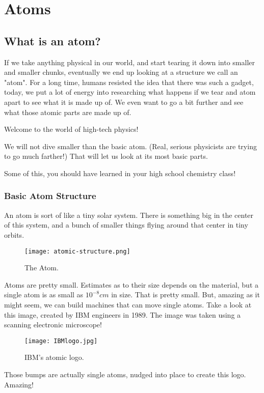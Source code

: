 \chapter{Atoms}
\section{What is an atom?}
If we take anything physical in our world, and start tearing it down into
smaller and smaller chunks, eventually we end up looking at a structure we call
an "atom". For a long time, humans resisted the idea that there was such a
gadget, today, we put a lot of energy into researching what happens if we tear
and atom apart to see what it is made up of. We even want to go a bit further and
see what those atomic parts are made up of.

Welcome to the world of high-tech physics!

We will not dive smaller than the basic atom. (Real, serious physicists are
trying to go much farther!) That will let us look at its most basic parts.

Some of this, you should have learned in your high school chemistry class!

\subsection{Basic Atom Structure}
An atom is sort of like a tiny solar system. There is something big in the
center of this system, and a bunch of smaller things flying around that center
in tiny orbits.

\begin{figure}[ht]
  \caption{The Atom.}
  \centering
  \texttt{[image: atomic-structure.png]}
\end{figure}

Atoms are pretty small. Estimates as to their size depends on the material, but
a single atom is as small as $10^{-8}cm$ in size. That is pretty small.
But, amazing as it might seem, we can build machines that can move single
atoms. Take a look at this image, created by IBM engineers in 1989. The image
was taken using a scanning electronic microscope!

\begin{figure}[ht]
  \caption{IBM's atomic logo.}
  \centering
  \texttt{[image: IBMlogo.jpg]}
\end{figure}

Those bumps are actually single atoms, nudged into place to create this logo.
Amazing!

